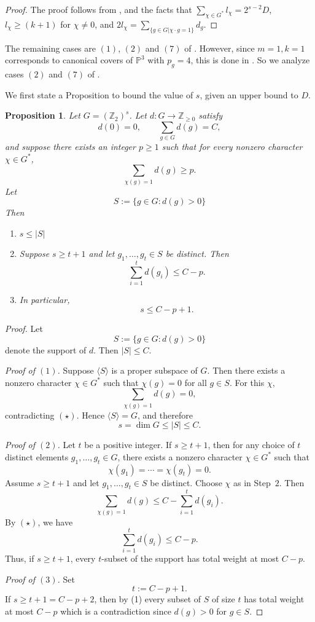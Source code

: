 \documentclass[12pt,twoside,]{amsart}
\theoremstyle{plain}
\newtheorem{proposition}[theorem]{Proposition}
\theoremstyle{definition}
\begin{document}
\begin{proof}
    The proof follows from , and the facts that $\sum_{\chi \in G^*} l_{\chi} = 2^{s-2}D$, $l_{\chi} \geq (k+1)$ for $\chi \neq 0$, and $2l_{\chi} = \sum_{\{g \in G|\chi \cdot g = 1\}} d_g$.
\end{proof}

The remaining cases are $(1)$, $(2)$ and $(7)$ of . However, since $m = 1, k = 1$ corresponds to canonical covers of $\mathbb{P}^3$ with $p_g = 4$, this is done in \cite{dugao16}. So we analyze cases $(2)$ and $(7)$ of . 

We first state a Proposition to bound the value of $s$, given an upper bound to $D$.

\begin{proposition}\label{bound to $s$}
Let $G=(\mathbb Z_2)^s$. Let $d:G\to\mathbb Z_{\ge 0}$ satisfy
\[
d(0)=0,\qquad \sum_{g\in G} d(g)=C,
\]
and suppose there exists an integer $p\ge 1$ such that for every nonzero
character $\chi\in G^*$,
\[
\sum_{\chi(g)=1} d(g)\ge p.
\tag{$\star$}
\]
Let
\[
S:=\{g\in G : d(g)>0\}
\]
Then
\begin{enumerate}
    \item  $s \leq |S|$
    \item Suppose $s \geq t+1$ and let $g_1,\dots,g_t \in S$ be distinct. Then 
    \[
    \sum_{i=1}^t d(g_i)\le C-p.
    \]
    \item In particular, 
    \[ s \le C-p+1. \]
\end{enumerate}

\end{proposition}

\begin{proof}
Let
\[
S:=\{g\in G : d(g)>0\}
\]
denote the support of $d$. Then $|S|\le C$.

\medskip

\noindent\textit{Proof of $(1)$.} Suppose $\langle S\rangle$ is a proper subspace of $G$. Then there exists a nonzero character $\chi\in G^*$ such that $\chi(g)=0$ for all $g\in S$. For
this $\chi$,
\[
\sum_{\chi(g)=1} d(g)=0,
\]
contradicting $(\star)$. Hence $\langle S\rangle=G$, and therefore
\[
s=\dim G\le |S|\le C.
\]

\medskip

\noindent
\noindent\textit{Proof of $(2)$.} Let $t$ be a positive integer. If $s\ge t+1$, then for any choice of $t$ distinct elements $g_1,\dots,g_t\in G$, there exists a nonzero character
$\chi\in G^*$ such that
\[
\chi(g_1)=\cdots=\chi(g_t)=0.
\]
Assume $s\ge t+1$ and let $g_1,\dots,g_t\in S$ be distinct. Choose $\chi$ as in
Step~$2$. Then
\[
\sum_{\chi(g)=1} d(g)
\leq C - \sum_{i=1}^t d(g_i).
\]
By $(\star)$, we have
\[
\sum_{i=1}^t d(g_i)\le C-p.
\tag{1}
\]
Thus, if $s\ge t+1$, every $t$-subset of the support has total weight at most
$C-p$.

\noindent\textit{Proof of $(3)$.} Set
\[
t := C-p+1.
\]
If $s\ge t+1=C-p+2$, then by (1) every subset of $S$ of size $t$ has total
weight at most $C-p$ which is a contradiction since $d(g) > 0$ for $g \in S$.
\end{proof}
\end{document}
